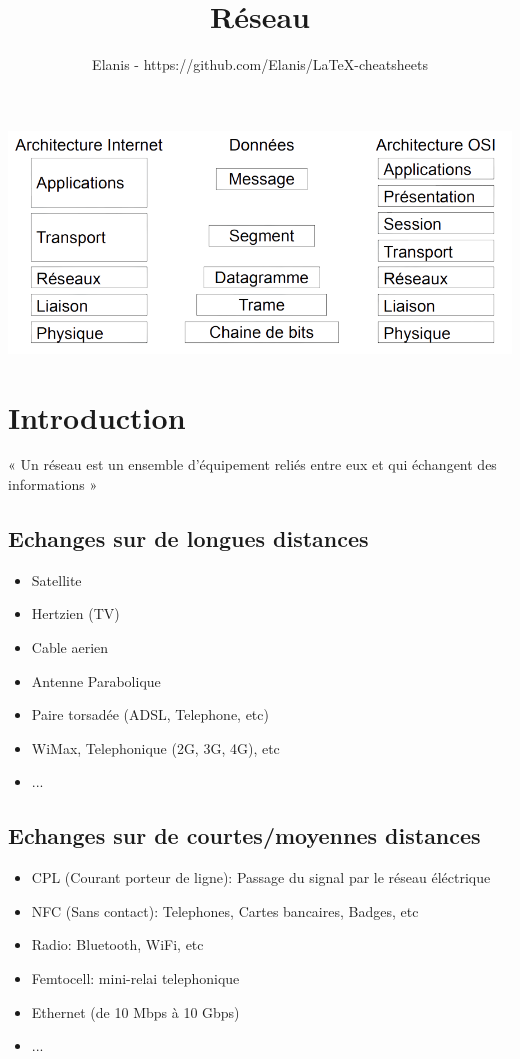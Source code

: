 \documentclass[a4paper, 12pt, french]{article}
\title{Réseau}
\author{Elanis - https://github.com/Elanis/LaTeX-cheatsheets}
\date{}
\begin{document}
	\maketitle

	\includegraphics[width=13.8cm]{reseau_modele_osi}

	\section{Introduction}

	« Un réseau est un ensemble d'équipement reliés entre eux et qui échangent des informations »

	\subsection{Echanges sur de longues distances}
	\begin{itemize}
		\item Satellite
		\item Hertzien (TV)
		\item Cable aerien
		\item Antenne Parabolique
		\item Paire torsadée (ADSL, Telephone, etc)
		\item WiMax, Telephonique (2G, 3G, 4G), etc
		\item ...
	\end{itemize}

	\subsection{Echanges sur de courtes/moyennes distances}
	\begin{itemize}
		\item CPL (Courant porteur de ligne): Passage du signal par le réseau éléctrique
		\item NFC (Sans contact): Telephones, Cartes bancaires, Badges, etc
		\item Radio: Bluetooth, WiFi, etc
		\item Femtocell: mini-relai telephonique
		\item Ethernet (de 10 Mbps à 10 Gbps)
		\item ...
	\end{itemize}
	
\end{document}
